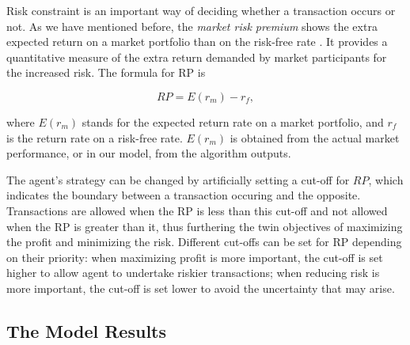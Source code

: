 \documentclass{mcmthesis}
\begin{document}

Risk constraint is an important way of deciding whether a transaction occurs or not.
As we have mentioned before, the \textit{market risk premium} shows the extra expected return on a market portfolio than on the risk-free rate \cite{duarte2015equity}.
It provides a quantitative measure of the extra return demanded by market participants for the increased risk.
The formula for RP is

\begin{equation}
  RP = E(r_m) - r_f,
\end{equation}

where $E(r_m)$ stands for the expected return rate on a market portfolio, and $r_f$ is the return rate on a risk-free rate.
$E(r_m)$ is obtained from the actual market performance, or in our model,
from the algorithm outputs.


The agent's strategy can be changed by artificially setting a cut-off for $RP$,
which indicates the boundary between a transaction occuring and the opposite.
Transactions are allowed when the RP is less than this cut-off and not allowed when the RP is greater than it, thus furthering the twin objectives of maximizing the profit and minimizing the risk.
Different cut-offs can be set for RP depending on their priority: when maximizing profit is more important, the cut-off is set higher to allow agent to undertake riskier transactions; when reducing risk is more important, the cut-off is set lower to avoid the uncertainty that may arise.


\subsection{The Model Results}
\end{document}
